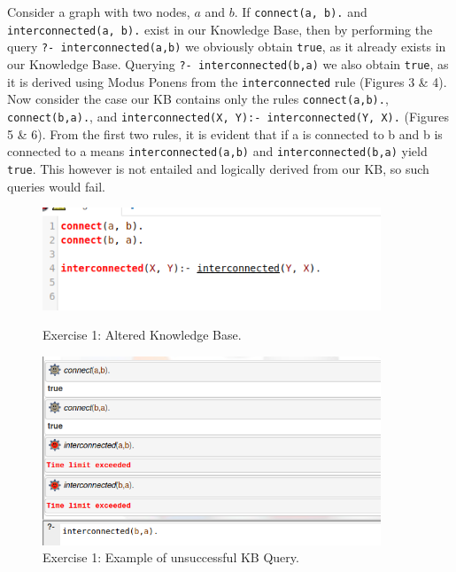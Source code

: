 \documentclass{article}
\def\code#1{\texttt{#1}}
\begin{document}
    Consider a graph with two nodes, $a$ and $b$. If \code{connect(a, b).} and \code{interconnected(a, b).} exist in our Knowledge Base, then by performing the query \code{?- interconnected(a,b)} we obviously obtain \code{true}, as it already exists in our Knowledge Base. Querying \code{?- interconnected(b,a)} we also obtain \code{true}, as it is derived using Modus Ponens from the \code{interconnected} rule (Figures 3 \& 4). \\
    
    Now consider the case our KB contains only the rules \code{connect(a,b).}, \code{connect(b,a).}, and \code{interconnected(X, Y):- interconnected(Y, X).} (Figures 5 \& 6). From the first two rules, it is evident that if a is connected to b and b is connected to a means \code{interconnected(a,b)} and \code{interconnected(b,a)} yield \code{true}. This however is not entailed and logically derived from our KB, so such queries would fail. 

    \begin{figure}
	\centering
	\begin{minipage}{0.45\textwidth}
		\centering
		\includegraphics[width=0.9\textwidth]{images/ex1_0_input} 
		\caption{Exercise 1: Altered Knowledge Base.}
		\label{ex1.2}
	\end{minipage}\hfill
	\begin{minipage}{0.45\textwidth}
		\centering
		\includegraphics[width=0.9\textwidth]{images/ex1_0_output} 
	   \caption{Exercise 1: Example of unsuccessful KB Query.}
	   \label{ex1.3}
	\end{minipage}
    \end{figure}
\end{document}

